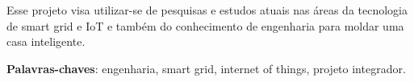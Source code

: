 \begin{resumo}
Esse projeto visa utilizar-se de pesquisas e estudos atuais nas áreas da tecnologia de smart grid e IoT e também do conhecimento de engenharia para moldar uma casa inteligente.
 \vspace{\onelineskip}

 \noindent
 \textbf{Palavras-chaves}: engenharia, smart grid, internet of things, projeto integrador.
\end{resumo}
